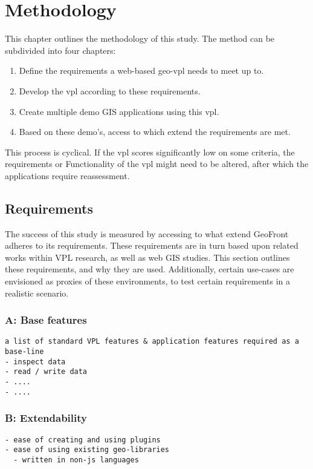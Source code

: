 \chapter{Methodology}
This chapter outlines the methodology of this study. 
The method can be subdivided into four chapters:

\begin{enumerate}[(1)]
  \item Define the requirements a web-based geo-vpl needs to meet up to.
  \item Develop the vpl according to these requirements.
  \item Create multiple demo GIS applications using this vpl.
  \item Based on these demo's, access to which extend the requirements are met.  
\end{enumerate}

This process is cyclical.
If the vpl scores significantly low on some criteria, the requirements or Functionality of the vpl might need to be altered, after which the applications require reassessment. 


\section{Requirements}
The success of this study is measured by accessing to what extend GeoFront adheres to its requirements. 
These requirements are in turn based upon related works within VPL research, as well as web GIS studies. 
This section outlines these requirements, and why they are used. 
Additionally, certain use-cases are envisioned as proxies of these environments, to test certain requirements in a realistic scenario. 



\subsection*{A: Base features}
\begin{lstlisting}
a list of standard VPL features & application features required as a base-line
- inspect data
- read / write data
- ....
- ....
\end{lstlisting}

\subsection*{B: Extendability}
\begin{lstlisting}
- ease of creating and using plugins 
- ease of using existing geo-libraries 
  - written in non-js languages
\end{lstlisting}


